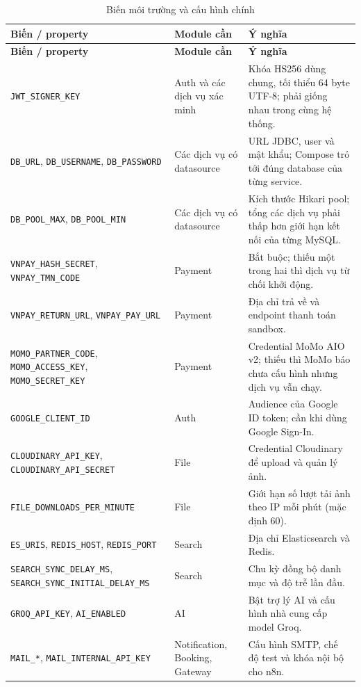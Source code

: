 \begingroup
\renewcommand{\code}[1]{\texttt{\footnotesize #1}}
\begin{longtable}{@{}L{5.4cm}L{3.2cm}L{6.25cm}@{}}
\caption{Biến môi trường và cấu hình chính}
\label{tab:env}\\
\toprule
\textbf{Biến / property} & \textbf{Module cần} & \textbf{Ý nghĩa}\\
\midrule
\endfirsthead
\toprule
\textbf{Biến / property} & \textbf{Module cần} & \textbf{Ý nghĩa}\\
\midrule
\endhead
\bottomrule
\endfoot
\code{JWT\_SIGNER\_KEY} & Auth và các dịch vụ xác minh & Khóa HS256 dùng chung, tối thiểu 64 byte UTF-8; phải giống nhau trong cùng hệ thống.\\
\code{DB\_URL}, \code{DB\_USERNAME}, \code{DB\_PASSWORD} & Các dịch vụ có datasource & URL JDBC, user và mật khẩu; Compose trỏ tới đúng database của từng service.\\
\code{DB\_POOL\_MAX}, \code{DB\_POOL\_MIN} & Các dịch vụ có datasource & Kích thước Hikari pool; tổng các dịch vụ phải thấp hơn giới hạn kết nối của từng MySQL.\\
\code{VNPAY\_HASH\_SECRET}, \code{VNPAY\_TMN\_CODE} & Payment & Bắt buộc; thiếu một trong hai thì dịch vụ từ chối khởi động.\\
\code{VNPAY\_RETURN\_URL}, \code{VNPAY\_PAY\_URL} & Payment & Địa chỉ trả về và endpoint thanh toán sandbox.\\
\code{MOMO\_PARTNER\_CODE}, \code{MOMO\_ACCESS\_KEY}, \code{MOMO\_SECRET\_KEY} & Payment & Credential MoMo AIO v2; thiếu thì MoMo báo chưa cấu hình nhưng dịch vụ vẫn chạy.\\
\code{GOOGLE\_CLIENT\_ID} & Auth & Audience của Google ID token; cần khi dùng Google Sign-In.\\
\code{CLOUDINARY\_API\_KEY}, \code{CLOUDINARY\_API\_SECRET} & File & Credential Cloudinary để upload và quản lý ảnh.\\
\code{FILE\_DOWNLOADS\_PER\_MINUTE} & File & Giới hạn số lượt tải ảnh theo IP mỗi phút (mặc định 60).\\
\code{ES\_URIS}, \code{REDIS\_HOST}, \code{REDIS\_PORT} & Search & Địa chỉ Elasticsearch và Redis.\\
\code{SEARCH\_SYNC\_DELAY\_MS}, \code{SEARCH\_SYNC\_INITIAL\_DELAY\_MS} & Search & Chu kỳ đồng bộ danh mục và độ trễ lần đầu.\\
\code{GROQ\_API\_KEY}, \code{AI\_ENABLED} & AI & Bật trợ lý AI và cấu hình nhà cung cấp model Groq.\\
\code{MAIL\_*}, \code{MAIL\_INTERNAL\_API\_KEY} & Notification, Booking, Gateway & Cấu hình SMTP, chế độ test và khóa nội bộ cho n8n.\\

\end{longtable}
